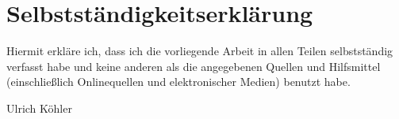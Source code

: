 \documentclass[pdftex,a4paper,titlepage,12pt]{scrartcl}
\newtheorem[L]{boxedDefinition}{Definition}
\begin{document}
\section{Selbstständigkeitserklärung}
Hiermit erkläre ich, dass ich die vorliegende Arbeit in allen Teilen selbstständig verfasst habe und keine anderen als die angegebenen Quellen und Hilfsmittel (einschließlich Onlinequellen und elektronischer Medien) benutzt habe. 
\vfill
\begin{center}
\underline{\hspace{10cm}}\vspace{1cm}
\end{center}
\begin{center}
Ulrich Köhler
\end{center}
\vfill
\end{document}
